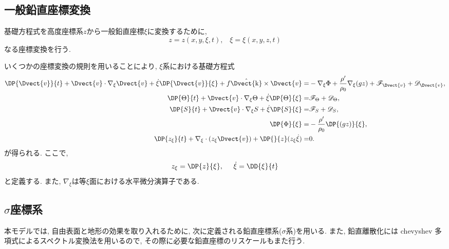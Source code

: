 \documentclass[a4j,12pt,openbib,oneside]{jreport}
\def\univec#1{ \hat{ \Dvect{\rm #1}} }
\begin{document}
\subsection{一般鉛直座標変換}
基礎方程式を高度座標系$z$から一般鉛直座標$\xi$に変換するために,  
\begin{equation}
 z= z(x,y,\xi,t), \;\;\; \xi = \xi(x,y,z,t)  
\end{equation}
なる座標変換を行う. 

いくつかの座標変換の規則を用いることにより, 
$\xi$系における基礎方程式
\begin{align}
  \DP{\Dvect{v}}{t} + \Dvect{v} \cdot \nabla_\xi \Dvect{v} + \dot{\xi} \DP{\Dvect{v}}{\xi} + f \univec{k} \times \Dvect{v} 
 =& - \nabla_\xi \Phi + \dfrac{\rho'}{\rho_0} \nabla_\xi (gz) 
  + \mathscr{F}_{\Dvect{v}} + \mathscr{D}_{\Dvect{v}}, \label{hmotion_Eq_genCoord} \\
   \DP{\Theta}{t} + \Dvect{v}\cdot\nabla_\xi\Theta + \dot{\xi} \DP{\Theta}{\xi} 
 =& \mathscr{F}_\Theta + \mathscr{D}_\Theta, \label{ptemp_Eq_genCoord} \\
   \DP{S}{t} + \Dvect{v}\cdot\nabla_\xi S + \dot{\xi}\DP{S}{\xi} 
 =& \mathscr{F}_S + \mathscr{D}_S, \label{salt_Eq_genCoord} \\
  \DP{\Phi}{\xi} =& - \dfrac{\rho'}{\rho_0} \DP{(gz)}{\xi}, \label{hydrostatic_Eq_genCoord} \\
  \DP{z_\xi}{t} + \nabla_\xi \cdot (z_\xi \Dvect{v}) + \DP{}{z}(z_\xi \dot{\xi}) =& 0 \label{continious_Eq_genCoord}. 
\end{align}
が得られる. 
ここで, 
\begin{align*}
 z_\xi = \DP{z}{\xi}, \;\;\;\;\;
 \dot{\xi} = \DD{\xi}{t}
\end{align*}
と定義する. 
また, $\nabla_\xi$は等$\xi$面における水平微分演算子である. 

\subsection{$\sigma$座標系}
本モデルでは, 自由表面と地形の効果を取り入れるために, 
次に定義される鉛直座標系($\sigma$系)を用いる. 
また, 鉛直離散化には chevyshev 多項式によるスペクトル変換法を用いるので, 
その際に必要な鉛直座標のリスケールもまた行う. 
\end{document}
